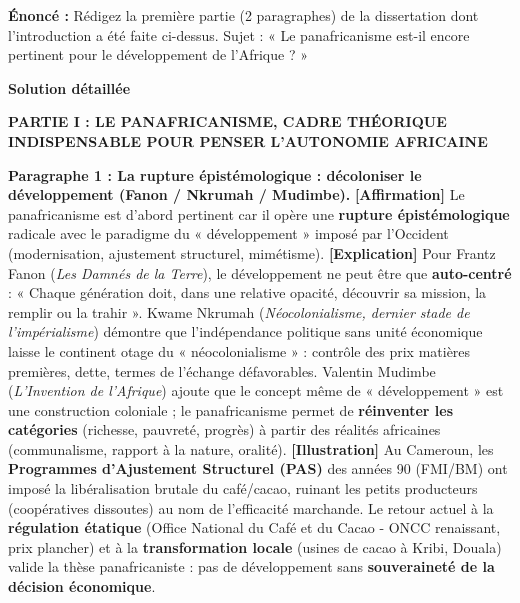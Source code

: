 \documentclass[11pt]{article}
\newcommand{\cle}[1]{{\popxbold\color{popdark}#1}}
\begin{document}
\begin{exoresolu}
\textbf{Énoncé :} Rédigez la première partie (2 paragraphes) de la dissertation dont l'introduction a été faite ci-dessus. Sujet : « Le panafricanisme est-il encore pertinent pour le développement de l'Afrique ? »

\tcblower
\textbf{Solution détaillée}

\textbf{PARTIE I : LE PANAFRICANISME, CADRE THÉORIQUE INDISPENSABLE POUR PENSER L'AUTONOMIE AFRICAINE}

\textbf{Paragraphe 1 : La rupture épistémologique : décoloniser le développement (Fanon / Nkrumah / Mudimbe).}
\textbf{[Affirmation]} Le panafricanisme est d'abord pertinent car il opère une \textbf{rupture épistémologique} radicale avec le paradigme du « développement » imposé par l'Occident (modernisation, ajustement structurel, mimétisme). \textbf{[Explication]} Pour \cle{Frantz Fanon} (\emph{Les Damnés de la Terre}), le développement ne peut être que \textbf{auto-centré} : « Chaque génération doit, dans une relative opacité, découvrir sa mission, la remplir ou la trahir ». \cle{Kwame Nkrumah} (\emph{Néocolonialisme, dernier stade de l'impérialisme}) démontre que l'indépendance politique sans unité économique laisse le continent otage du « néocolonialisme » : contrôle des prix matières premières, dette, termes de l'échange défavorables. \cle{Valentin Mudimbe} (\emph{L'Invention de l'Afrique}) ajoute que le concept même de « développement » est une construction coloniale ; le panafricanisme permet de \textbf{réinventer les catégories} (richesse, pauvreté, progrès) à partir des réalités africaines (communalisme, rapport à la nature, oralité). \textbf{[Illustration]} Au Cameroun, les \textbf{Programmes d'Ajustement Structurel (PAS)} des années 90 (FMI/BM) ont imposé la libéralisation brutale du café/cacao, ruinant les petits producteurs (coopératives dissoutes) au nom de l'efficacité marchande. Le retour actuel à la \textbf{régulation étatique} (Office National du Café et du Cacao - ONCC renaissant, prix plancher) et à la \textbf{transformation locale} (usines de cacao à Kribi, Douala) valide la thèse panafricaniste : pas de développement sans \textbf{souveraineté de la décision économique}.


\end{exoresolu}
\end{document}
